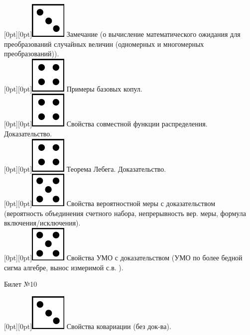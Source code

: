 \documentclass[10pt]{article}
\begin{document}
\raisebox{-1pt}[0pt][0pt]{\includegraphics[width=0.02\linewidth]{3.png}} Замечание (о вычисление  математического ожидания для преобразований случайных величин (одномерных и многомерных преобразований)). \\

\raisebox{-1pt}[0pt][0pt]{\includegraphics[width=0.02\linewidth]{4.png}} Примеры базовых копул. \\

\raisebox{-1pt}[0pt][0pt]{\includegraphics[width=0.02\linewidth]{4.png}} Свойства совместной функции распределения. Доказательство. \\

\raisebox{-1pt}[0pt][0pt]{\includegraphics[width=0.02\linewidth]{4.png}} Теорема Лебега. Доказательство. \\

\raisebox{-1pt}[0pt][0pt]{\includegraphics[width=0.02\linewidth]{5.png}} Свойства  вероятностной меры с доказательством (вероятность объединения счетного набора, непрерывность вер. меры, формула включения/исключения). \\

\raisebox{-1pt}[0pt][0pt]{\includegraphics[width=0.02\linewidth]{5.png}} Свойства УМО с доказательством (УМО по более бедной сигма алгебре, вынос измеримой с.в. ). \\

\begin{center} {\Large Билет №10} \end{center} 

\raisebox{-1pt}[0pt][0pt]{\includegraphics[width=0.02\linewidth]{3.png}} Свойства ковариации (без док-ва). \\
\end{document}
